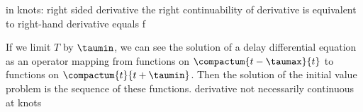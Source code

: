     in knots: right sided derivative
    the right continuability of derivative is equivalent to right-hand derivative equals f


    \cite{Roussel04DDEs}
    If we limit $T$ by $\taumin$, we can see the solution of a delay differential equation as an operator mapping from functions on $\compactum{t-\taumax}{t}$ to functions on $\compactum{t}{t+\taumin}$.
    Then the solution of the initial value problem is the sequence of these functions.
    derivative not necessarily continuous at knots






